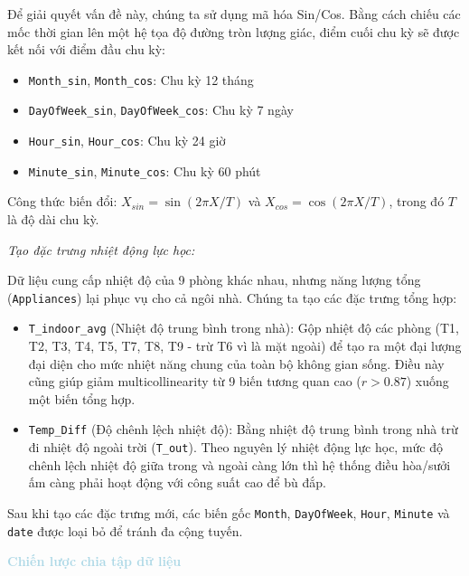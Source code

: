 Để giải quyết vấn đề này, chúng ta sử dụng mã hóa Sin/Cos. Bằng cách chiếu các mốc thời gian lên một hệ tọa độ đường tròn lượng giác, điểm cuối chu kỳ sẽ được kết nối với điểm đầu chu kỳ:

\begin{itemize} [labelsep=10pt, leftmargin=2cm]
    \item \texttt{Month\_sin}, \texttt{Month\_cos}: Chu kỳ 12 tháng
    \item \texttt{DayOfWeek\_sin}, \texttt{DayOfWeek\_cos}: Chu kỳ 7 ngày
    \item \texttt{Hour\_sin}, \texttt{Hour\_cos}: Chu kỳ 24 giờ
    \item \texttt{Minute\_sin}, \texttt{Minute\_cos}: Chu kỳ 60 phút
\end{itemize}

Công thức biến đổi: $X_{sin} = \sin(2\pi X / T)$ và $X_{cos} = \cos(2\pi X / T)$, trong đó $T$ là độ dài chu kỳ.

\textit{Tạo đặc trưng nhiệt động lực học:}

Dữ liệu cung cấp nhiệt độ của 9 phòng khác nhau, nhưng năng lượng tổng (\texttt{Appliances}) lại phục vụ cho cả ngôi nhà. Chúng ta tạo các đặc trưng tổng hợp:

\begin{itemize} [labelsep=10pt, leftmargin=2cm]
    \item \texttt{T\_indoor\_avg} (Nhiệt độ trung bình trong nhà): Gộp nhiệt độ các phòng (T1, T2, T3, T4, T5, T7, T8, T9 - trừ T6 vì là mặt ngoài) để tạo ra một đại lượng đại diện cho mức nhiệt năng chung của toàn bộ không gian sống. Điều này cũng giúp giảm multicollinearity từ 9 biến tương quan cao ($r > 0.87$) xuống một biến tổng hợp.
    
    \item \texttt{Temp\_Diff} (Độ chênh lệch nhiệt độ): Bằng nhiệt độ trung bình trong nhà trừ đi nhiệt độ ngoài trời (\texttt{T\_out}). Theo nguyên lý nhiệt động lực học, mức độ chênh lệch nhiệt độ giữa trong và ngoài càng lớn thì hệ thống điều hòa/sưởi ấm càng phải hoạt động với công suất cao để bù đắp.
\end{itemize}

Sau khi tạo các đặc trưng mới, các biến gốc \texttt{Month}, \texttt{DayOfWeek}, \texttt{Hour}, \texttt{Minute} và \texttt{date} được loại bỏ để tránh đa cộng tuyến.

\vspace{0.5em}
\noindent\textcolor{lightblue}{\textbf{Chiến lược chia tập dữ liệu}}
\vspace{0.5em}

